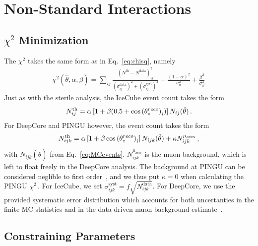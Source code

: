 % 
% 
\section{Non-Standard Interactions}\label{sec:nsiResults}
\subsection{\texorpdfstring{$\chi^2$}{Chi-squared} Minimization}
    The $\chi^2$ takes the same form as in Eq.~\ref{eq:chisq}, namely 
\begin{align} \label{eq:chisq2}
    \chi^{2}(\hat{\theta},\alpha,\beta)=\sum_{ij} \frac{\left(N^\text{th}-N^\text{data}\right)_{ij}^{2}}
    {\left(\sigma^\text{data}_{ij}\right)^{2} + \left(\sigma^\text{syst}_{ij}\right)^{2}}+ 
    \frac{(1-\alpha)^2}{\sigma_\alpha^2} + \frac{\beta^2}{\sigma_\beta^2}\,
\end{align}
Just as with the sterile analysis, the IceCube event count takes the form 
\begin{align}
    N^\text{th}_{ij} = \alpha\left[1+\beta (0.5 + \cos{(\theta_z^{reco})}_i )\right] N_{ij}(\hat{\theta})\,.
\end{align}
For DeepCore and PINGU however, the event count takes the form
\begin{align}
    N^\text{th}_{ijk} = \alpha\left[1+\beta \cos{(\theta_z^{reco})}_i \right] N_{ijk}(\hat{\theta}) + \kappa N_{ijk}^{\mu_{atm}}\,,
\end{align}
with $N_{ijk}(\hat{\theta})$ from Eq.~\ref{eq:MCevents}. $N_{ijk}^{\mu_{atm}}$ is the muon background, which is left to float freely in the DeepCore analysis.
The background at PINGU can be considered neglible to first order~\cite{PINGUdata}, and we thus put $\kappa=0$ when calculating the PINGU $\chi^2$\,.
For IceCube, we set $\sigma_{ijk}^\text{syst} = f\sqrt{N_{ijk}^\text{data}}$.
For DeepCore, we use the provided systematic error distribution which accounts for both uncertanties in the finite MC statistics and in the data-driven 
muon background estimate~\cite{DC2019data}.
\subsection{Constraining Parameters}

% 